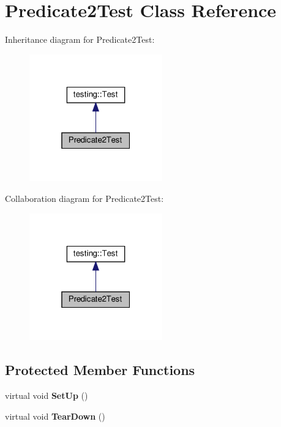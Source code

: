 \hypertarget{class_predicate2_test}{}\section{Predicate2\+Test Class Reference}
\label{class_predicate2_test}


Inheritance diagram for Predicate2\+Test\+:
\nopagebreak
\begin{figure}[H]
\begin{center}
\leavevmode
\includegraphics[width=163pt]{class_predicate2_test__inherit__graph}
\end{center}
\end{figure}


Collaboration diagram for Predicate2\+Test\+:
\nopagebreak
\begin{figure}[H]
\begin{center}
\leavevmode
\includegraphics[width=163pt]{class_predicate2_test__coll__graph}
\end{center}
\end{figure}
\subsection*{Protected Member Functions}
\begin{DoxyCompactItemize}
\item 
\mbox{\label{class_predicate2_test_a9778563daf4846327d32061c1a8ccba0}} 
virtual void {\bfseries Set\+Up} ()
\item 
\mbox{\label{class_predicate2_test_a7379f8f7772af6b4c76edcc90b6aaaeb}} 
virtual void {\bfseries Tear\+Down} ()
\end{DoxyCompactItemize}
